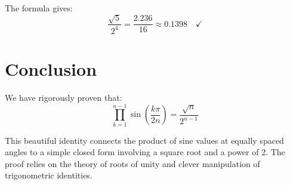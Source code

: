 \documentclass{article}
\begin{document}
The formula gives:
\begin{equation}
\frac{\sqrt{5}}{2^4} = \frac{2.236}{16} \approx 0.1398 \quad \checkmark
\end{equation}

\section{Conclusion}

We have rigorously proven that:
\begin{equation}
\boxed{\prod_{k=1}^{n-1} \sin\left(\frac{k\pi}{2n}\right) = \frac{\sqrt{n}}{2^{n-1}}}
\end{equation}

This beautiful identity connects the product of sine values at equally spaced angles to a simple closed form involving a square root and a power of 2. The proof relies on the theory of roots of unity and clever manipulation of trigonometric identities.
\end{document}
